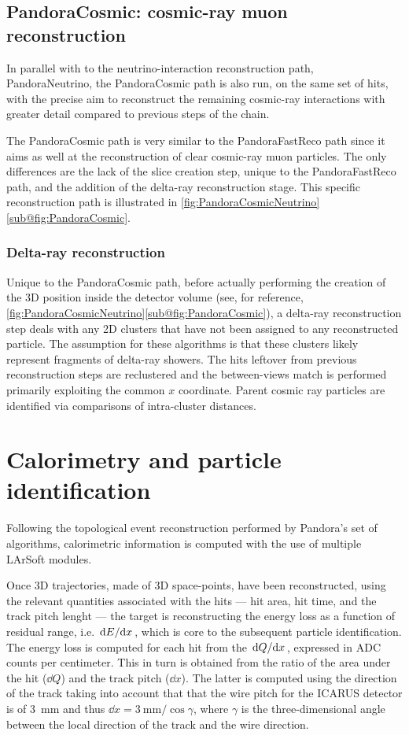 \subsection{PandoraCosmic: cosmic-ray muon reconstruction}

In parallel with to the neutrino-interaction reconstruction path, PandoraNeutrino, the PandoraCosmic path is also run, on the same set of hits, with the precise aim to reconstruct the remaining cosmic-ray interactions with greater detail compared to previous steps of the chain. 

The PandoraCosmic path is very similar to the PandoraFastReco path since it aims as well at the reconstruction of clear cosmic-ray muon particles. The only differences are the lack of the slice creation step, unique to the PandoraFastReco path, and the addition of the delta-ray reconstruction stage. This specific reconstruction path is illustrated in \autoref{fig:PandoraCosmicNeutrino}\ref{sub@fig:PandoraCosmic}. 

\subsubsection{Delta-ray reconstruction}

Unique to the PandoraCosmic path, before actually performing the creation of the 3D position inside the detector volume (see, for reference, \autoref{fig:PandoraCosmicNeutrino}\ref{sub@fig:PandoraCosmic}), a delta-ray reconstruction step deals with any 2D clusters that have not been assigned to any reconstructed particle. The assumption for these algorithms is that these clusters likely represent fragments of delta-ray showers. The hits leftover from previous reconstruction steps are reclustered and the between-views match is performed primarily exploiting the common $x$ coordinate. Parent cosmic ray particles are identified via comparisons of intra-cluster distances. 

\section{Calorimetry and particle identification} \label{sec:calorimetryAndCalibration}

Following the topological event reconstruction performed by Pandora's set of algorithms, calorimetric information is computed with the use of multiple LArSoft modules. 

Once 3D trajectories, made of 3D space-points, have been reconstructed, using the relevant quantities associated with the hits --- hit area, hit time, and the track pitch lenght --- the target is reconstructing the energy loss as a function of residual range, i.e. $\dv*{E}{x}$, which is core to the  subsequent particle identification. The energy loss is computed for each hit from the $\dv*{Q}{x}$, expressed in ADC counts per centimeter. This in turn is obtained from the ratio of the area under the hit ($\dd Q$) and the track pitch ($\dd x$).  The latter is computed using the direction of the track taking into account that that the wire pitch for the ICARUS detector is of \SI{3}{\mm} and thus $\dd x = \SI{3}{\mm}/\cos\gamma$, where $\gamma$ is the three-dimensional angle between the local direction of the track and the wire direction. 

